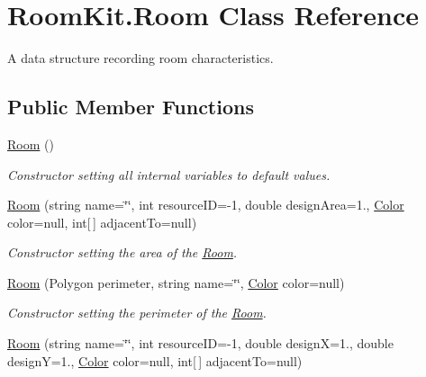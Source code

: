 \hypertarget{class_room_kit_1_1_room}{}\section{Room\+Kit.\+Room Class Reference}
\label{class_room_kit_1_1_room}


A data structure recording room characteristics.  


\subsection*{Public Member Functions}
\begin{DoxyCompactItemize}
\item 
\mbox{\hyperlink{class_room_kit_1_1_room_a15c13a2f850ec32872c0b95627ebbb04}{Room}} ()
\begin{DoxyCompactList}\small\item\em Constructor setting all internal variables to default values. \end{DoxyCompactList}\item 
\mbox{\hyperlink{class_room_kit_1_1_room_a9bcaf10fbec164053d9d510722ceeff5}{Room}} (string name=\char`\"{}\char`\"{}, int resource\+ID=-\/1, double design\+Area=1., \mbox{\hyperlink{class_room_kit_1_1_room_ab988d7b6d772b68911acacc8da422052}{Color}} color=null, int\mbox{[}$\,$\mbox{]} adjacent\+To=null)
\begin{DoxyCompactList}\small\item\em Constructor setting the area of the \mbox{\hyperlink{class_room_kit_1_1_room}{Room}}. \end{DoxyCompactList}\item 
\mbox{\hyperlink{class_room_kit_1_1_room_a4ebb8022be4e847cf614df791da51539}{Room}} (Polygon perimeter, string name=\char`\"{}\char`\"{}, \mbox{\hyperlink{class_room_kit_1_1_room_ab988d7b6d772b68911acacc8da422052}{Color}} color=null)
\begin{DoxyCompactList}\small\item\em Constructor setting the perimeter of the \mbox{\hyperlink{class_room_kit_1_1_room}{Room}}. \end{DoxyCompactList}\item 
\mbox{\hyperlink{class_room_kit_1_1_room_a8556c2465decaeff214621c3e8606596}{Room}} (string name=\char`\"{}\char`\"{}, int resource\+ID=-\/1, double designX=1., double designY=1., \mbox{\hyperlink{class_room_kit_1_1_room_ab988d7b6d772b68911acacc8da422052}{Color}} color=null, int\mbox{[}$\,$\mbox{]} adjacent\+To=null)

\end{DoxyCompactItemize}
